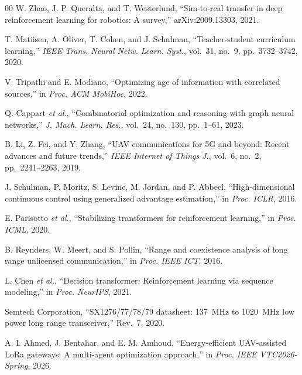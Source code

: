 \documentclass[conference]{IEEEtran}
\begin{document}
\begin{thebibliography}{00}
W. Zhao, J. P. Queralta, and T. Westerlund,
``Sim-to-real transfer in deep reinforcement learning for robotics:
A survey,''
arXiv:2009.13303, 2021.

T. Matiisen, A. Oliver, T. Cohen, and J. Schulman,
``Teacher-student curriculum learning,''
\textit{IEEE Trans. Neural Netw. Learn. Syst.}, vol.~31, no.~9,
pp.~3732--3742, 2020.

V. Tripathi and E. Modiano,
``Optimizing age of information with correlated sources,''
in \textit{Proc. ACM MobiHoc}, 2022.

Q. Cappart \textit{et al.},
``Combinatorial optimization and reasoning with graph neural networks,''
\textit{J. Mach. Learn. Res.}, vol.~24, no.~130, pp.~1--61, 2023.

B. Li, Z. Fei, and Y. Zhang,
``{UAV} communications for 5{G} and beyond:
Recent advances and future trends,''
\textit{IEEE Internet of Things J.}, vol.~6, no.~2,
pp.~2241--2263, 2019.

J. Schulman, P. Moritz, S. Levine, M. Jordan, and P. Abbeel,
``High-dimensional continuous control using generalized advantage estimation,''
in \textit{Proc. ICLR}, 2016.

E. Parisotto \textit{et al.},
``Stabilizing transformers for reinforcement learning,''
in \textit{Proc. ICML}, 2020.

B. Reynders, W. Meert, and S. Pollin,
``Range and coexistence analysis of long range unlicensed communication,''
in \textit{Proc. IEEE ICT}, 2016.

L. Chen \textit{et al.},
``Decision transformer: Reinforcement learning via sequence modeling,''
in \textit{Proc. NeurIPS}, 2021.

{Semtech Corporation},
``{SX1276/77/78/79} datasheet: 137~{MHz} to 1020~{MHz} low power long range transceiver,''
Rev.~7, 2020.

A. I. Ahmed, J. Bentahar, and E. M. Amhoud,
``Energy-efficient {UAV}-assisted {LoRa} gateways:
A multi-agent optimization approach,''
in \textit{Proc. IEEE VTC2026-Spring}, 2026.

\end{thebibliography}
\end{document}
